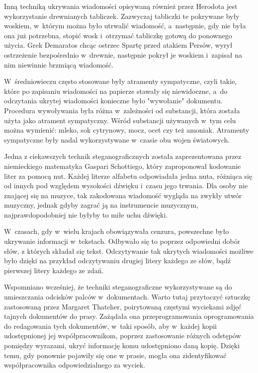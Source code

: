 \documentclass[a4paper, twoside, openright, 12pt]{report}
\begin{document}
        Inną techniką ukrywania wiadomości opisywaną również przez Herodota
        jest wykorzystanie drewnianych tabliczek. Zazwyczaj tabliczki te pokrywane
        były woskiem, w~którym można było utrwalić wiadomość, a~następnie, gdy
        nie była ona już potrzebna, stopić wosk i~otrzymać tabliczkę gotową do
        ponownego użycia. Grek Demaratos chcąc ostrzec Spartę przed atakiem Persów,
        wyrył ostrzeżenie bezpośrednio w~drewnie, następnie pokrył je woskiem
        i~zapisał na nim niewinnie brzmiącą wiadomość.

        W~średniowieczu często stosowane były atramenty sympatyczne, czyli takie,
        które po zapisaniu wiadomości na papierze stawały się niewidoczne, a~do
        odczytania ukrytej wiadomości konieczne było "wywołanie" dokumentu. Procedura
        wywoływania była różna w~zależności od substancji, która została użyta jako
        atrament sympatyczny. Wśród substancji używanych w~tym celu można wymienić:
        mleko, sok cytrynowy, mocz, ocet czy też amoniak. Atramenty sympatyczne
        były nadal wykorzystywane w~czasie obu wojen światowych.

        Jedna z ciekawszych technik steganograficznych została zaprezentowana przez
        niemieckiego matematyka Gaspari Schottiego\cite{NUTYSTEGANOGRAFIA},
        który zaproponował kodowanie liter za pomocą nut. Każdej literze alfabetu
        odpowiadała jedna nuta, różniąca się od innych pod względem wysokości
        dźwięku i~czasu jego trwania. Dla osoby nie znającej się na muzyce, tak zakodowana
        wiadomość wygląda na zwykły utwór muzyczny, jednak gdyby zagrać ją na instrumencie
        muzycznym, najprawdopodobniej nie byłyby to miłe uchu dźwięki.

        W~czasach, gdy w~wielu krajach obowiązywała cenzura, powszechne było ukrywanie
        informacji w~tekstach. Odbywało się to poprzez odpowiedni dobór słów,
        z których składał się tekst. Odczytywanie tak ukrytych wiadomości możliwe było
        dzięki na przykład odczytywaniu drugiej litery każdego ze słów, bądź pierwszej
        litery każdego ze zdań.

        Wspomniano wcześniej, że techniki steganograficzne wykorzystywane są do umieszczania
        odcisków palców w~dokumentach. Warto tutaj przytoczyć sztuczkę zastosowaną
        przez Margaret Thatcher, poirytowaną częstymi wyciekami zdjęć tajnych dokumentów
        do prasy. Zażądała ona przeprogramowania oprogramowania do redagowania tych
        dokumentów, w~taki sposób, aby w~każdej kopii udostępnionej jej współpracownikom,
        poprzez zastosowanie różnych odstępów pomiędzy wyrazami, ukryć informację
        komu udostępniono daną kopię. Dzięki temu, gdy ponownie pojawiły się one w
        prasie, mogła ona zidentyfikować współpracownika odpowiedzialnego za wyciek\cite{DIGITALWATERMARKING}.
\end{document}
